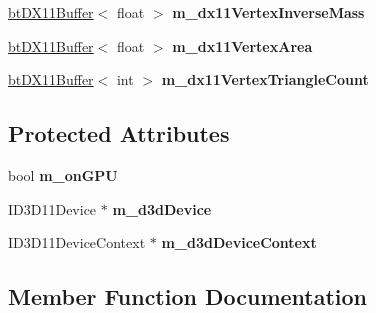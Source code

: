 \begin{DoxyCompactItemize}
\hyperlink{classbtDX11Buffer}{bt\+D\+X11\+Buffer}$<$ float $>$ {\bfseries m\+\_\+dx11\+Vertex\+Inverse\+Mass}
\item 
\mbox{\label{classbtSoftBodyVertexDataDX11_adf7418a9f245e9f0eb11138dc79fb41a}} 
\hyperlink{classbtDX11Buffer}{bt\+D\+X11\+Buffer}$<$ float $>$ {\bfseries m\+\_\+dx11\+Vertex\+Area}
\item 
\mbox{\label{classbtSoftBodyVertexDataDX11_a0ac1cc8d74bd3b019c0e4f90d95555b9}} 
\hyperlink{classbtDX11Buffer}{bt\+D\+X11\+Buffer}$<$ int $>$ {\bfseries m\+\_\+dx11\+Vertex\+Triangle\+Count}
\end{DoxyCompactItemize}
\subsection*{Protected Attributes}
\begin{DoxyCompactItemize}
\item 
\mbox{\label{classbtSoftBodyVertexDataDX11_abb25699f7147c3fe273ec2bbc7e187bf}} 
bool {\bfseries m\+\_\+on\+G\+PU}
\item 
\mbox{\label{classbtSoftBodyVertexDataDX11_a5c80289866107d2ea9d8eed44a1dd064}} 
I\+D3\+D11\+Device $\ast$ {\bfseries m\+\_\+d3d\+Device}
\item 
\mbox{\label{classbtSoftBodyVertexDataDX11_afde821354301b368be4eb78d1230e0e8}} 
I\+D3\+D11\+Device\+Context $\ast$ {\bfseries m\+\_\+d3d\+Device\+Context}
\end{DoxyCompactItemize}


\subsection{Member Function Documentation}
\mbox{\label{classbtSoftBodyVertexDataDX11_a32d4193d6e162e0a7a57975ebbab7a16}} 

